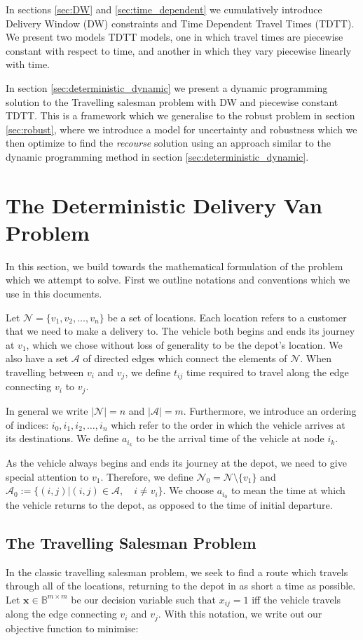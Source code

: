 In sections \ref{sec:DW} and \ref{sec:time_dependent} we cumulatively introduce Delivery Window (DW) constraints and Time Dependent Travel Times (TDTT). We present two models TDTT models, one in which travel times are piecewise constant with respect to time, and another in which they vary piecewise linearly with time.

In section \ref{sec:deterministic_dynamic} we present a dynamic programming solution to the Travelling salesman problem with DW and piecewise constant TDTT. This is a framework which we generalise to the robust problem in section \ref{sec:robust}, where we introduce a model for uncertainty and robustness which we then optimize to find the \textit{recourse} solution using an approach similar to the dynamic programming method in section \ref{sec:deterministic_dynamic}.
\section{The Deterministic Delivery Van Problem}
\label{sec:deterministic}
In this section, we build towards the mathematical formulation of the problem which we attempt to solve. First we outline notations and conventions which we use in this documents. 

Let $\mathcal{N} = \{v_1, v_2, \ldots, v_n\}$ be a set of locations. Each location refers to a customer that we need to make a delivery to. The vehicle both begins and ends its journey at $v_1$, which we chose without loss of generality to be the depot's location. We also have a set $\mathcal{A}$ of directed edges which connect the elements of $\mathcal{N}$. When travelling between $v_i$ and $v_j$, we define $t_{ij}$ time required to travel along the edge connecting $v_i$ to $v_j$. 

In general we write $|\mathcal{N}| = n$ and $|\mathcal{A}| = m$. Furthermore, we introduce an ordering of indices: $i_0, i_1, i_2, \ldots, i_n$ which refer to the order in which the vehicle arrives at its destinations. We define $a_{i_k}$ to be the arrival time of the vehicle at node $i_k$. 

As the vehicle always begins and ends its journey at the depot, we need to give special attention to $v_1$. Therefore, we define $\mathcal{N}_0 = \mathcal{N}\setminus\{v_1\}$ and $\mathcal{A}_0 := \{(i,j)| (i,j) \in \mathcal{A}, \quad i \neq v_i\}$. We choose $a_{i_0} $ to mean the time at which the vehicle returns to the depot, as opposed to the time of initial departure.

\subsection{The Travelling Salesman Problem}
In the classic travelling salesman problem, we seek to find a route which travels through all of the locations, returning to the depot in as short a time as possible. Let $\mathbf{x} \in \mathbb{B}^{m\times m}$ be our decision variable such that $x_{ij}=1$ iff the vehicle travels along the edge connecting $v_i$ and $v_j$. With this notation, we write out our objective function to minimise:

